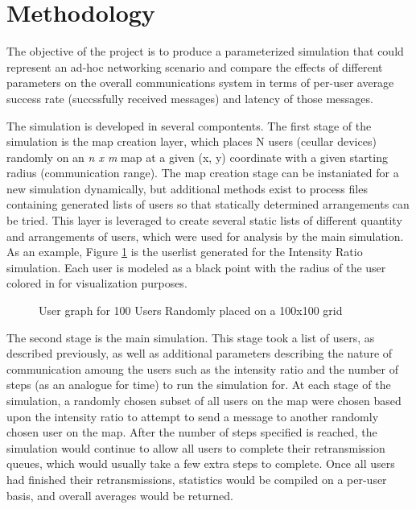 \section{Methodology}
The objective of the project is to produce a parameterized simulation 
that could represent an ad-hoc networking scenario and compare the effects 
of different parameters on the overall communications system in terms of 
per-user average success rate (succssfully received messages) 
and latency of those messages.

The simulation is developed in several compontents.
The first stage of the simulation is the map creation layer,
which places N users (ceullar devices) randomly on an \textit{n x m} map at a
given (x, y) coordinate with a given starting radius (communication range).
The map creation stage can be instaniated for a new simulation dynamically, 
but additional methods exist to process files containing generated lists of 
users so that statically determined arrangements can be tried.
This layer is leveraged to create several static lists of different quantity
and arrangements of users, which were used for analysis by the main simulation.
As an example, Figure \ref{fig:usergraph} is the userlist
generated for the Intensity Ratio simulation.
Each user is modeled as a black point with the radius of the user colored in
for visualization purposes.
\par
\begin{figure}
    
    \caption{User graph for 100 Users Randomly placed on a 100x100 grid}
    \label{fig:usergraph}
\end{figure}
\par

The second stage is the main simulation.
This stage took a list of users, as described previously, as well as additional
parameters describing the nature of communication amoung the users such as
the intensity ratio and the number of steps (as an analogue for time) to run 
the simulation for.
At each stage of the simulation, a randomly chosen subset of all users on the map
were chosen based upon the intensity ratio to attempt to send a message to another
randomly chosen user on the map.
After the number of steps specified is reached, the simulation would continue
to allow all users to complete their retransmission queues, which would usually
take a few extra steps to complete.
Once all users had finished their retransmissions, statistics would be compiled
on a per-user basis, and overall averages would be returned.

